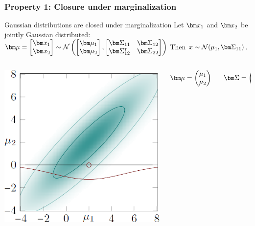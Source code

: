 
\begin{frame}
\frametitle{Property 1: Closure under marginalization}

\begin{block}{Gaussian distributions are closed under marginalization}
Let $\bx_1$ and $\bx_2$ be jointly Gaussian distributed:
$\bmu =
\begin{bmatrix}
\bx_1\\
\bx_2
\end{bmatrix}
\sim \norm\left(
\begin{bmatrix}
\bmu_1\\
\bmu_2
\end{bmatrix},
\begin{bmatrix}
\bSigma_{11} & \bSigma_{12}\\
\bSigma_{12}\transpose & \bSigma_{22}
\end{bmatrix}
\right)$
\vspace*{0.3cm}
Then $x \sim \norm(\mu_1, \bSigma_{11})$.
\end{block}

\begin{columns}[T]
\begin{column}{.3\textwidth}
\includegraphics[width=\textwidth]{images/plots/Gaussian-2d-marginalization.png}
\end{column}
\begin{column}{.5\textwidth}
\vspace*{1cm}
$\bmu =
\begin{pmatrix}
\mu_1\\
\mu_2
\end{pmatrix}
\;\;\;\;\;\;
\bSigma = 
\begin{pmatrix}
\sigma^2_{11}\;\;\sigma^2_{12}\\
\sigma^2_{21}\;\;\sigma^2_{22}\\
\end{pmatrix}
$
\end{column}


\end{columns}
\end{frame}
